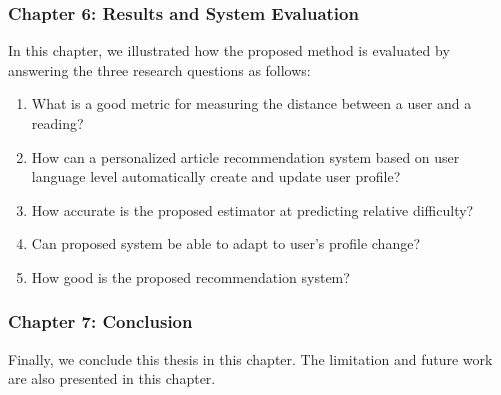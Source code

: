 \subsubsection{Chapter 6: Results and System Evaluation}
\vspace{10pt}
In this chapter, we illustrated how the proposed method is evaluated by answering the three research questions as follows:
\begin{enumerate}
  \item What is a good metric for measuring the distance between a user and a reading?
  \vspace{10pt}
  \item How can a personalized article recommendation system based on user language level automatically create and update user profile?
  \vspace{10pt}
  \item How accurate is the proposed estimator at predicting relative difficulty?
  \vspace{10pt}
  \item Can proposed system be able to adapt to user's profile change?
  \vspace{10pt}
  \item How good is the proposed recommendation system?
\end{enumerate}

\subsubsection{Chapter 7: Conclusion}
\vspace{10pt}
Finally, we conclude this thesis in this chapter. The limitation and future work are also presented in this chapter.







